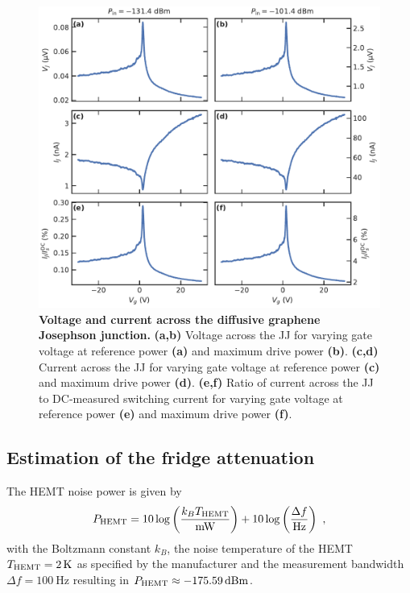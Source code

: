 \begin{figure}
	\centering
	\includegraphics[width=\linewidth]{chapter-gJJ-CPR/figs/SMFigure-poweratJJ}
	\caption{
		\textbf{Voltage and current across the diffusive graphene Josephson junction.}
		\textbf{(a,b)} Voltage across the JJ for varying gate voltage at reference power \textbf{(a)} and maximum drive power \textbf{(b)}.
		\textbf{(c,d)} Current across the JJ for varying gate voltage at reference power \textbf{(c)} and maximum drive power \textbf{(d)}.
		\textbf{(e,f)} Ratio of current across the JJ to DC-measured switching current for varying gate voltage at reference power \textbf{(e)} and maximum drive power \textbf{(f)}.
	}
	\label{fig:SMFigpoweratJJ}
\end{figure}


\subsection{Estimation of the fridge attenuation}\label{sec:attenuation}
The HEMT noise power is given by
%
\begin{align}
P_{\rm HEMT}=10\log\left(\frac{k_B T_{\rm HEMT}}{\si{\milli\watt}}\right) + 10\log\left(\frac{\Delta f}{\si{\hertz}}\right)\ ,
\label{eq:HEMT}
\end{align}
%
with the Boltzmann constant $k_B$, the noise temperature of the HEMT $T_{\rm HEMT}=\SI{2}{\kelvin}$ as specified by the manufacturer and the measurement bandwidth $\Delta f=\SI{100}{\hertz}$ resulting in $P_{\rm HEMT}\approx\SI{-175.59}{dBm}$.

